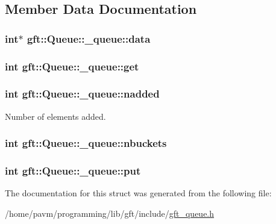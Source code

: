 \subsection{Member Data Documentation}
\hypertarget{structgft_1_1Queue_1_1__queue_a306d1f000046c6b8f31cdbaa79073401}{
\subsubsection[{data}]{\setlength{\rightskip}{0pt plus 5cm}int$\ast$ gft\-::\-Queue\-::\-\_\-queue\-::data}}\label{structgft_1_1Queue_1_1__queue_a306d1f000046c6b8f31cdbaa79073401}
\hypertarget{structgft_1_1Queue_1_1__queue_a8c802bf1bbd217d89aea8a71cc3f6ee8}{
\subsubsection[{get}]{\setlength{\rightskip}{0pt plus 5cm}int gft\-::\-Queue\-::\-\_\-queue\-::get}}\label{structgft_1_1Queue_1_1__queue_a8c802bf1bbd217d89aea8a71cc3f6ee8}
\hypertarget{structgft_1_1Queue_1_1__queue_ad93612d6060096d1561bd99327e8b70c}{
\subsubsection[{nadded}]{\setlength{\rightskip}{0pt plus 5cm}int gft\-::\-Queue\-::\-\_\-queue\-::nadded}}\label{structgft_1_1Queue_1_1__queue_ad93612d6060096d1561bd99327e8b70c}


Number of elements added. 

\hypertarget{structgft_1_1Queue_1_1__queue_a07cec5556e3d465ec8487e6142071b10}{
\subsubsection[{nbuckets}]{\setlength{\rightskip}{0pt plus 5cm}int gft\-::\-Queue\-::\-\_\-queue\-::nbuckets}}\label{structgft_1_1Queue_1_1__queue_a07cec5556e3d465ec8487e6142071b10}
\hypertarget{structgft_1_1Queue_1_1__queue_a48a458b35f17d2a4460e8675508e872c}{
\subsubsection[{put}]{\setlength{\rightskip}{0pt plus 5cm}int gft\-::\-Queue\-::\-\_\-queue\-::put}}\label{structgft_1_1Queue_1_1__queue_a48a458b35f17d2a4460e8675508e872c}


The documentation for this struct was generated from the following file\-:\begin{DoxyCompactItemize}
\item 
/home/pavm/programming/lib/gft/include/\hyperlink{gft__queue_8h}{gft\-\_\-queue.\-h}\end{DoxyCompactItemize}
